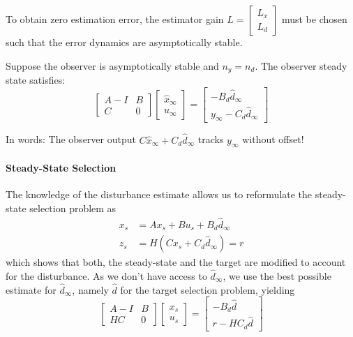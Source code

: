 \newpar{}
To obtain zero estimation error, the estimator gain $L = \begin{bmatrix} L_x \\ L_d \end{bmatrix}$ must be chosen such that the error dynamics are asymptotically stable.

\newpar{}

Suppose the observer is asymptotically stable and $n_y = n_d$. The observer steady state satisfies:
\begin{equation*}
    \begin{bmatrix}
        A - I & B \\
        C     & 0
    \end{bmatrix}
    \begin{bmatrix}
        \hat{x}_\infty \\
        u_\infty
    \end{bmatrix}
    =
    \begin{bmatrix}
        - B_d \hat{d}_\infty \\
        y_\infty - C_d \hat{d}_\infty
    \end{bmatrix}
\end{equation*}

In words: The observer output $C \hat{x}_\infty + C_d \hat{d}_\infty$ tracks $y_\infty$ without offset!

\paragraph{Steady-State Selection}
The knowledge of the disturbance estimate allows us to reformulate the steady-state selection problem as
\begin{align*}
    x_s & = Ax_s + Bu_s + B_d \hat{d}_\infty \\
    z_s & = H(Cx_s + C_d \hat{d}_\infty) = r
\end{align*}
which shows that both, the steady-state and the target are modified to account for the disturbance.
\newpar{}
As we don't have access to $\hat{d}_\infty$, we use the best possible estimate for $\hat{d}_\infty$, namely $\hat{d}$ for the target selection problem, yielding
\begin{equation*}
    \begin{bmatrix}
        A - I & B \\
        HC    & 0
    \end{bmatrix}
    \begin{bmatrix}
        x_s \\
        u_s
    \end{bmatrix}
    =
    \begin{bmatrix}
        - B_d \hat{d} \\
        r - HC_d \hat{d}
    \end{bmatrix}
\end{equation*}

